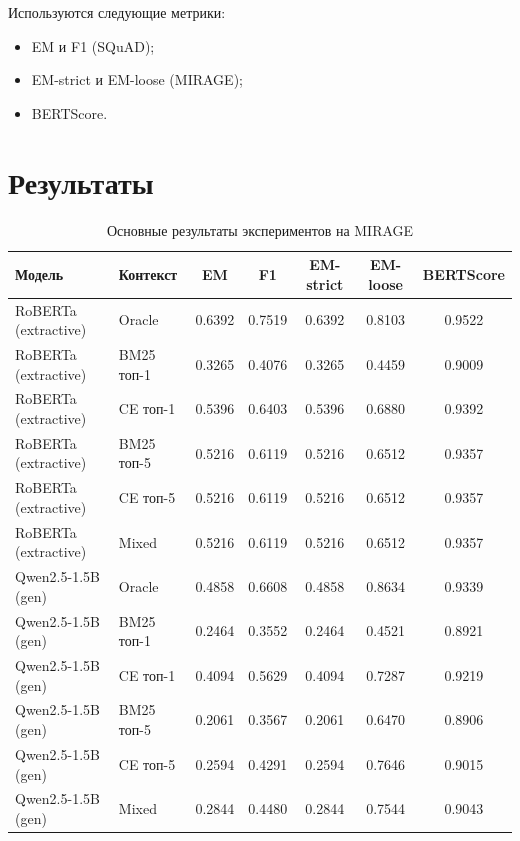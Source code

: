 \documentclass[11pt]{article}
\begin{document}
Используются следующие метрики:
\begin{itemize}
    \item EM и F1 (SQuAD);
    \item EM-strict и EM-loose (MIRAGE);
    \item BERTScore.
\end{itemize}

\section{Результаты}

\begin{table}[t]
\centering
\small
\begin{tabular}{llccccc}
\toprule
Модель & Контекст & EM & F1 & EM-strict & EM-loose & BERTScore \\
\midrule
RoBERTa (extractive) & Oracle      & 0.6392 & 0.7519 & 0.6392 & 0.8103 & 0.9522 \\
RoBERTa (extractive) & BM25 топ-1  & 0.3265 & 0.4076 & 0.3265 & 0.4459 & 0.9009 \\
RoBERTa (extractive) & CE топ-1    & 0.5396 & 0.6403 & 0.5396 & 0.6880 & 0.9392 \\
RoBERTa (extractive) & BM25 топ-5  & 0.5216 & 0.6119 & 0.5216 & 0.6512 & 0.9357 \\
RoBERTa (extractive) & CE топ-5    & 0.5216 & 0.6119 & 0.5216 & 0.6512 & 0.9357 \\
RoBERTa (extractive) & Mixed       & 0.5216 & 0.6119 & 0.5216 & 0.6512 & 0.9357 \\
\midrule
Qwen2.5-1.5B (gen)   & Oracle      & 0.4858 & 0.6608 & 0.4858 & 0.8634 & 0.9339 \\
Qwen2.5-1.5B (gen)   & BM25 топ-1  & 0.2464 & 0.3552 & 0.2464 & 0.4521 & 0.8921 \\
Qwen2.5-1.5B (gen)   & CE топ-1    & 0.4094 & 0.5629 & 0.4094 & 0.7287 & 0.9219 \\
Qwen2.5-1.5B (gen)   & BM25 топ-5  & 0.2061 & 0.3567 & 0.2061 & 0.6470 & 0.8906 \\
Qwen2.5-1.5B (gen)   & CE топ-5    & 0.2594 & 0.4291 & 0.2594 & 0.7646 & 0.9015 \\
Qwen2.5-1.5B (gen)   & Mixed       & 0.2844 & 0.4480 & 0.2844 & 0.7544 & 0.9043 \\
\bottomrule
\end{tabular}
\caption{Основные результаты экспериментов на MIRAGE}
\label{tab:main}
\end{table}
\end{document}
